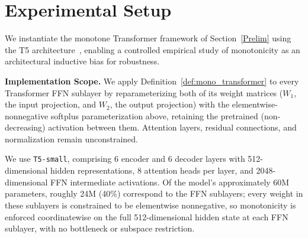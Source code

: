 \documentclass{article}
\theoremstyle{plain}
\theoremstyle{definition}
\newtheorem{definition}[theorem]{Definition}
\theoremstyle{remark}
\begin{document}

% 



\section{Experimental Setup}
We instantiate the monotone Transformer framework of Section~\ref{Prelim} using the T5 architecture~\cite{raffel2020exploring}, enabling a controlled empirical study of monotonicity as an architectural inductive bias for robustness.

\textbf{Implementation Scope.}
We apply Definition~\ref{def:mono_transformer} to every Transformer FFN sublayer
by reparameterizing both of its weight matrices ($W_1$, the input projection,
and $W_2$, the output projection) with the elementwise-nonnegative softplus
parameterization above, retaining the pretrained (non-decreasing) activation
between them. Attention layers, residual connections, and normalization remain
unconstrained.

We use \texttt{T5-small}, comprising 6 encoder and 6 decoder layers with 512-dimensional hidden representations, 8 attention heads per layer, and 2048-dimensional FFN intermediate activations. Of the model's approximately 60M parameters, roughly 24M (40\%) correspond to the FFN sublayers; every weight in these sublayers is constrained to be elementwise nonnegative, so monotonicity is enforced coordinatewise on the full 512-dimensional hidden state at each FFN sublayer, with no bottleneck or subspace restriction.
\end{document}
